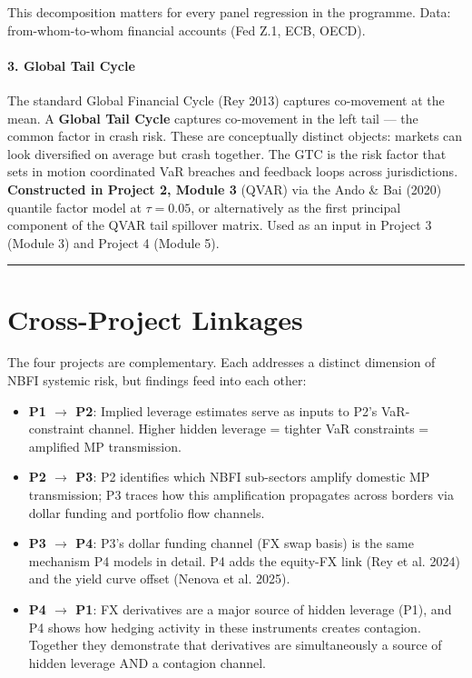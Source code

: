 \documentclass[11pt,a4paper]{article}
\begin{document}
This decomposition matters for every panel regression in the programme. Data: from-whom-to-whom financial accounts (Fed Z.1, ECB, OECD).


\paragraph{3. Global Tail Cycle}

The standard Global Financial Cycle (Rey 2013) captures co-movement at the mean. A \textbf{Global Tail Cycle} captures co-movement in the left tail --- the common factor in crash risk. These are conceptually distinct objects: markets can look diversified on average but crash together. The GTC is the risk factor that sets in motion coordinated VaR breaches and feedback loops across jurisdictions. \textbf{Constructed in Project 2, Module 3} (QVAR) via the Ando \& Bai (2020) quantile factor model at $\tau = 0.05$, or alternatively as the first principal component of the QVAR tail spillover matrix. Used as an input in Project 3 (Module 3) and Project 4 (Module 5).


\bigskip\noindent\rule{\textwidth}{0.4pt}\bigskip


\section{Cross-Project Linkages}

The four projects are complementary. Each addresses a distinct dimension of NBFI
systemic risk, but findings feed into each other:

\begin{itemize}
\item \textbf{P1 $\rightarrow$ P2}: Implied leverage estimates serve as inputs to P2's VaR-constraint
channel. Higher hidden leverage = tighter VaR constraints = amplified MP transmission.

\item \textbf{P2 $\rightarrow$ P3}: P2 identifies which NBFI sub-sectors amplify domestic MP transmission;
P3 traces how this amplification propagates across borders via dollar funding
and portfolio flow channels.

\item \textbf{P3 $\rightarrow$ P4}: P3's dollar funding channel (FX swap basis) is the same mechanism
P4 models in detail. P4 adds the equity-FX link (Rey et al. 2024) and the yield
curve offset (Nenova et al. 2025).

\item \textbf{P4 $\rightarrow$ P1}: FX derivatives are a major source of hidden leverage (P1), and P4
shows how hedging activity in these instruments creates contagion. Together they
demonstrate that derivatives are simultaneously a source of hidden leverage AND
a contagion channel.

\end{itemize}
\end{document}
